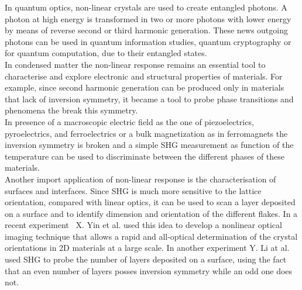   
In quantum optics, non-linear crystals are used to create entangled photons. A photon at high energy is transformed in two or more photons with lower energy by means of reverse second or third harmonic generation. These news outgoing photons can be used in quantum information studies, quantum cryptography or for quantum computation, due to their entangled states.\cite{PhysRevLett.75.4337}\\ 
In condensed matter the non-linear response remains an essential tool to characterise and explore electronic and structural properties of materials. 
For example, since second harmonic generation can be produced only in materials that lack of inversion symmetry, it became a tool to probe phase transitions and phenomena the break this symmetry. \\
In presence of a macroscopic electric field as the one of piezoelectrics, pyroelectrics, and ferroelectrics or a bulk magnetization as in ferromagnets the inversion symmetry is broken and a simple SHG measurement as function of the temperature can be used to discriminate between the different phases of these materials.\\ %
Another import application of non-linear response is the characterisation of surfaces and interfaces. Since SHG is much more sensitive to the lattice orientation, compared with linear optics, it can be used to scan a layer deposited on a surface and to identify  dimension and orientation of the different flakes. 
In a recent experiment~\cite{yin2014edge}  X. Yin et al. used this idea to develop a nonlinear optical imaging technique that allows a rapid and all-optical determination of the crystal orientations in 2D materials at a large scale. %
In another experiment Y. Li at al. used SHG to probe the number of layers deposited on a surface, using the fact that an even number of layers posses inversion symmetry while an odd one does not.\cite{doi:10.1021/nl401561r}\\
